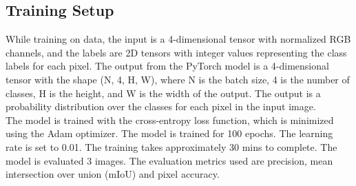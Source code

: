 \subsection{Training Setup}
While training on data, the input is a 4-dimensional tensor with normalized RGB channels, and the labels are 2D tensors with integer values representing the class labels for each pixel. The output from the PyTorch model is a 4-dimensional tensor with the shape (N, 4, H, W), where N is the batch size, 4 is the number of classes, H is the height, and W is the width of the output. The output is a probability distribution over the classes for each pixel in the input image.
\\ The model is trained with the cross-entropy loss function, which is minimized using the Adam optimizer. The model is trained for 100 epochs. The learning rate is set to 0.01. The training takes approximately 30 mins to complete. The model is evaluated 3 images. The evaluation metrics used are precision, mean intersection over union (mIoU) and pixel accuracy. 
